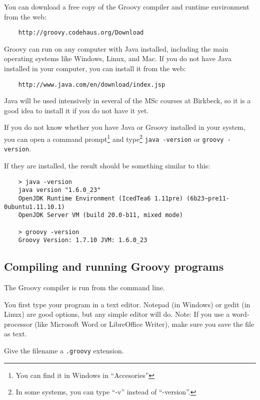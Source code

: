  
You can download a free copy of the Groovy compiler and runtime environment 
from the web:

\begin{verbatim}
    http://groovy.codehaus.org/Download
\end{verbatim}

Groovy can run on any computer with Java installed, including the main
operating systems like Windows, Linux, and Mac. If you do not have
Java installed in your computer, you can install it from the web:

\begin{verbatim}
    http://www.java.com/en/download/index.jsp
\end{verbatim}

Java will be used intensively in several of the MSc courses 
at Birkbeck, so it is a good idea to install it if you do not have it
yet.

If you do not know whether you have Java or Groovy installed in your
system, you can open a command prompt\footnote{You can find it in Windows in
  ``Accesories''} and type\footnote{In some systems, you can type
  ``-v'' instead of ``-version''.} \verb+java -version+ 
or \verb+groovy -version+. 

If they are installed, the result should be something similar to this:

\begin{verbatim}
    > java -version
    java version "1.6.0_23"
    OpenJDK Runtime Environment (IcedTea6 1.11pre) (6b23~pre11-0ubuntu1.11.10.1)
    OpenJDK Server VM (build 20.0-b11, mixed mode)

    > groovy -version
    Groovy Version: 1.7.10 JVM: 1.6.0_23
\end{verbatim}



\subsection*{Compiling and running Groovy programs}

The Groovy compiler is run from the command line.

You first type your program in a text editor. Notepad (in Windows) or
gedit (in Linux) are good options, but any simple editor will
do. Note: If you use a word-processor (like Microsoft Word or
LibreOffice Writer), make sure you save the file as text.

Give the filename a \texttt{.groovy} extension.

